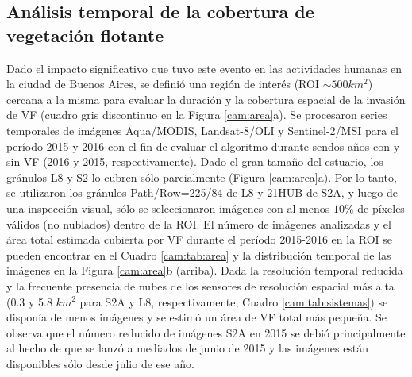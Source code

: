     \subsection{Análisis temporal de la cobertura de vegetación flotante}
    \label{cam:s:temporal}
        Dado el impacto significativo que tuvo este evento en las actividades humanas en la ciudad de Buenos Aires, se definió una región de interés (ROI $\sim 500 km^{2}$) cercana a la misma para evaluar la duración y la cobertura espacial de la invasión de VF (cuadro gris discontinuo en la Figura \ref{cam:area}a). Se procesaron series temporales de imágenes Aqua/MODIS, Landsat-8/OLI y Sentinel-2/MSI para el período 2015 y 2016 con el fin de evaluar el algoritmo durante sendos años con y sin VF (2016 y 2015, respectivamente). Dado el gran tamaño del estuario, los gránulos L8 y S2 lo cubren sólo parcialmente (Figura \ref{cam:area}a). Por lo tanto, se utilizaron los gránulos Path/Row=225/84 de L8 y 21HUB de S2A, y luego de una inspección visual, sólo se seleccionaron imágenes con al menos $10 \%$ de píxeles válidos (no nublados) dentro de la ROI. El número de imágenes analizadas y el área total estimada cubierta por VF durante el período 2015-2016 en la ROI se pueden encontrar en el Cuadro \ref{cam:tab:area} y la distribución temporal de las imágenes en la Figura \ref{cam:area}b (arriba). Dada la resolución temporal reducida y la frecuente presencia de nubes de los sensores de resolución espacial más alta (0.3 y 5.8 $km^{2}$ para S2A y L8, respectivamente, Cuadro \ref{cam:tab:sistemas}) se disponía de menos imágenes y se estimó un área de VF total más pequeña. Se observa que el número reducido de imágenes S2A en 2015 se debió principalmente al hecho de que se lanzó a mediados de junio de 2015 y las imágenes están disponibles sólo desde julio de ese año.



